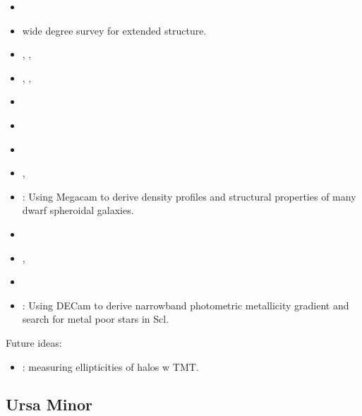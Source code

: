 \begin{itemize}
\tightlist
\item
  \citet{sestito+2023a}
\item
  \citet{westfall+2006} wide degree survey for extended structure.
\item
  \citet{tolstoy+2023}, \citet{arroyo-polonio+2023},
  \citet{arroyo-polonio+2024}
\item
  \citet{eskridge1988}, \citet{eskridge1988a}, \citet{eskridge1988b}
\item
  \citet{coleman+dacosta+bland-hawthorn2005}
\item
  \citet{DQ1994}
\item
  \citet{WMO2009}
\item
  \citet{IH1995},
\item
  \citet{munoz+2018}: Using Megacam to derive density profiles and
  structural properties of many dwarf spheroidal galaxies.
\item
  \citet{kirby+2009}
\item
  \citet{martinez-vazquez+2015}, \citet{pietrzynski+2008}
\item
  \citet{grebel1996}
\item
  \citet{barbosa+2025}: Using DECam to derive narrowband photometric
  metallicity gradient and search for metal poor stars in Scl.
\end{itemize}

Future ideas:

\begin{itemize}
\tightlist
\item
  \citet{evslin2016}: measuring ellipticities of halos w TMT.
\end{itemize}

\subsection{Ursa Minor}\label{ursa-minor}

